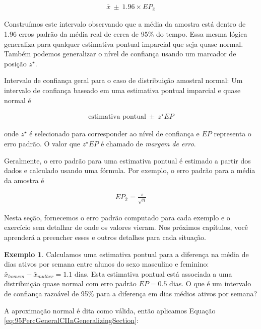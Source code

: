 \documentclass[
]{book}
\theoremstyle{definition}
\theoremstyle{definition}
\newtheorem{example}{Exemplo}[chapter]
\theoremstyle{definition}
\theoremstyle{definition}
\theoremstyle{remark}
\begin{document}
\begin{align}
  \bar{x}\ \pm\ 1.96 \times EP_{\bar{x}}
  \label{eq:95PercCIForMeanInGeneralizingSection}
\end{align}

Construímos este intervalo observando que a média da amostra está dentro de 1.96 erros padrão da média real de cerca de 95\% do tempo. Essa mesma lógica generaliza para qualquer estimativa pontual imparcial que seja quase normal. Também podemos generalizar o nível de confiança usando um marcador de posição \(z^{\star}\).

Intervalo de confiança geral para o caso de distribuição amostral normal: Um intervalo de confiança baseado em uma estimativa pontual imparcial e quase normal é

\begin{eqnarray}
\text{estimativa pontual}\ \pm\ z^{\star}EP
\label{eq:95PercGeneralCIInGeneralizingSection}
\end{eqnarray}

onde \(z^{\star}\) é selecionado para corresponder ao nível de confiança e \(EP\) representa o erro padrão. O valor que \(z^{\star}EP\) é chamado de \emph{margem de erro}.

Geralmente, o erro padrão para uma estimativa pontual é estimado a partir dos dados e calculado usando uma fórmula. Por exemplo, o erro padrão para a média da amostra é

\begin{eqnarray*}
EP_{\bar{x}} = \frac{s}{\sqrt{n}}
\end{eqnarray*}

Nesta seção, fornecemos o erro padrão computado para cada exemplo e o exercício sem detalhar de onde os valores vieram. Nos próximos capítulos, você aprenderá a preencher esses e outros detalhes para cada situação.

\begin{example}
\protect\hypertarget{exm:unnamed-chunk-180}{}{\label{exm:unnamed-chunk-180} }Calculamos uma estimativa pontual para a diferença na média de dias ativos por semana entre alunos do sexo masculino e feminino: \(\bar{x}_{homem}-\bar{x}_{mulher}=1.1\) dias. Esta estimativa pontual está associada a uma distribuição quase normal com erro padrão \(EP = 0.5\) dias. O que é um intervalo de confiança razoável de 95\% para a diferença em dias médios ativos por semana?
\end{example}

A aproximação normal é dita como válida, então aplicamos Equação \eqref{eq:95PercGeneralCIInGeneralizingSection}:
\end{document}
